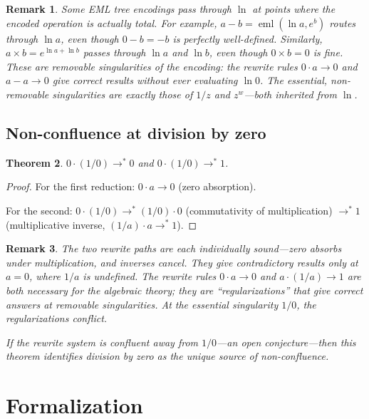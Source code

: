 \documentclass[11pt]{article}
\newtheorem{theorem}{Theorem}
\newtheorem{remark}[theorem]{Remark}
\begin{document}
\begin{remark}
Some EML tree encodings pass through $\ln$ at points where the
encoded operation is actually total.  For example,
$a - b = \operatorname{eml}(\ln a, e^b)$ routes through $\ln a$,
even though $0 - b = -b$ is perfectly well-defined.  Similarly,
$a \times b = e^{\ln a + \ln b}$ passes through $\ln a$ and
$\ln b$, even though $0 \times b = 0$ is fine.
These are \emph{removable} singularities of the encoding: the rewrite
rules $0 \cdot a \to 0$ and $a - a \to 0$ give correct results
without ever evaluating $\ln 0$.  The essential, non-removable
singularities are exactly those of $1/z$ and $z^w$---both inherited
from $\ln$.
\end{remark}

\subsection{Non-confluence at division by zero}

\begin{theorem}\label{thm:nonconf}
$0 \cdot (1/0) \to^{*} 0$ \;and\; $0 \cdot (1/0) \to^{*} 1$.
\end{theorem}

\begin{proof}
For the first reduction: $0 \cdot a \to 0$ (zero absorption).

For the second: $0 \cdot (1/0) \to^{*} (1/0) \cdot 0$ (commutativity
of multiplication) $\to^{*} 1$ (multiplicative inverse,
$(1/a) \cdot a \to^{*} 1$).
\end{proof}

\begin{remark}
The two rewrite paths are each individually sound---zero absorbs under
multiplication, and inverses cancel.  They give contradictory results
only at $a = 0$, where $1/a$ is undefined.  The rewrite rules
$0 \cdot a \to 0$ and $a \cdot (1/a) \to 1$ are both necessary for
the algebraic theory; they are ``regularizations'' that give correct
answers at removable singularities.  At the essential singularity
$1/0$, the regularizations conflict.

If the rewrite system is confluent away from $1/0$---an open
conjecture---then this theorem identifies division by zero as the
\emph{unique} source of non-confluence.
\end{remark}

\section{Formalization}
\label{sec:formalization}
\end{document}
